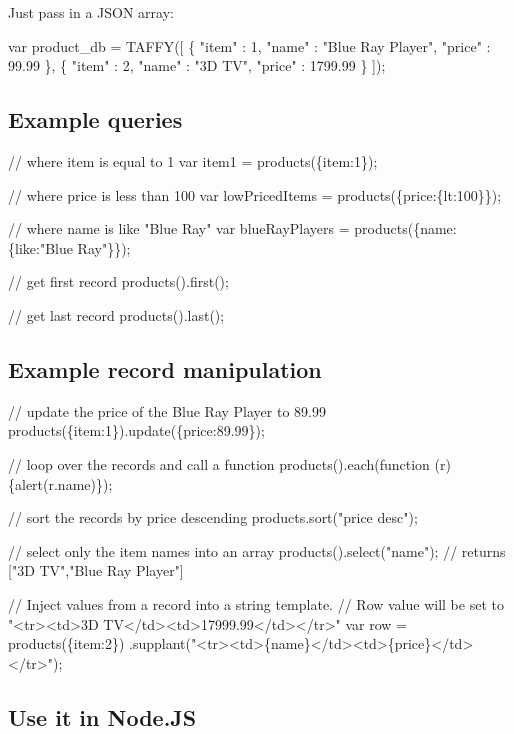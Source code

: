 Just pass in a J\+S\+ON array\+:


\begin{DoxyCode}
var product\_db = TAFFY([
  \{ "item"  : 1,
    "name"  : "Blue Ray Player",
    "price" : 99.99
  \},
  \{ "item"  : 2,
    "name"  : "3D TV",
    "price" : 1799.99
  \}
]);
\end{DoxyCode}


\subsection*{Example queries}


\begin{DoxyCode}
// where item is equal to 1
var item1 = products(\{item:1\});

// where price is less than 100
var lowPricedItems = products(\{price:\{lt:100\}\});

// where name is like "Blue Ray"
var blueRayPlayers = products(\{name:\{like:"Blue Ray"\}\});

// get first record
products().first();

// get last record
products().last();
\end{DoxyCode}


\subsection*{Example record manipulation}


\begin{DoxyCode}
// update the price of the Blue Ray Player to 89.99
products(\{item:1\}).update(\{price:89.99\});

// loop over the records and call a function
products().each(function (r) \{alert(r.name)\});

// sort the records by price descending
products.sort("price desc");

// select only the item names into an array
products().select("name"); // returns ["3D TV","Blue Ray Player"]

// Inject values from a record into a string template.
// Row value will be set to "<tr><td>3D TV</td><td>17999.99</td></tr>"
var row = products(\{item:2\})
  .supplant("<tr><td>\{name\}</td><td>\{price\}</td></tr>");
\end{DoxyCode}


\subsection*{Use it in Node.\+JS}

